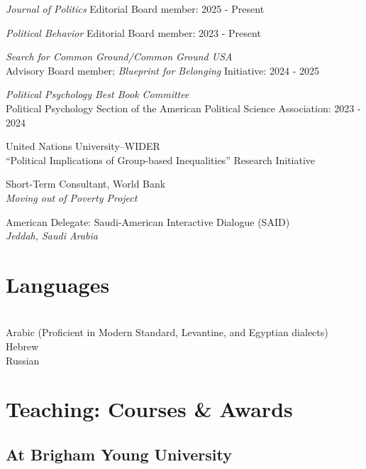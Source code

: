 \documentclass[10pt]{article}
\begin{document}
%
\raggedright
\textit{Journal of Politics} Editorial Board member: 2025 - Present\\[5pt]

%
\raggedright
\textit{Political Behavior} Editorial Board member: 2023 - Present\\[5pt]

%
\raggedright
\textit{Search for Common Ground/Common Ground USA} \\
Advisory Board member; \textit{Blueprint for Belonging} Initiative: 2024 - 2025\\[5pt]

%
\raggedright
\textit{Political Psychology Best Book Committee} \\
Political Psychology Section of the American Political Science Association: 2023 - 2024\\[5pt]

%
\raggedright
United Nations University--WIDER\\
``Political Implications of Group-based Inequalities'' Research Initiative\\[5pt]

%
\raggedright
Short-Term Consultant, World Bank\\
{\em Moving out of Poverty Project}\\[5pt]

%
\raggedright
American Delegate: Saudi-American Interactive Dialogue (SAID) \\
{\em Jeddah, Saudi Arabia}\ \\[18pt]
	
	


\section{Languages}
\ \\
Arabic (Proficient in Modern Standard, Levantine, and Egyptian dialects)\\
Hebrew\\
Russian\ \\[18pt]



\section{Teaching: Courses \& Awards}

\begin{flushleft}
\subsection*{At Brigham Young University}
\end{flushleft}
\end{document}
